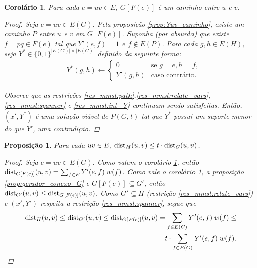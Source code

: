 \documentclass[11pt,reqno]{amsart}
\newcommand{\dist}{{\rm dist}}
\newtheorem{proposicao}{Proposição}
\newtheorem{corolario}{Corolário}
\begin{document}
\begin{corolario}
\label{corol:Yuv_define_caminho}
Para cada $e = uv \in E$, $G[F(e)]$ é um 
caminho entre $u$ e $v$.
\begin{proof}
Seja $e = uv \in E(G)$. Pela proposição \ref{prop:Yuv_caminho}, existe um 
caminho $P$ entre $u$ e $v$ em $G[F(e)]$. Suponha (por absurdo) que existe 
$f = pq \in F(e)$ tal que $Y'(e,f) = 1$ e $f \notin E(P)$. Para cada 
$g,h \in E(H)$, seja $Y^* \in \{0,1\}^{|E(G)| \times |E(G)|}$ definido da seguinte forma: 
\begin{align*}
&Y^*(g,h)\leftarrow
\begin{cases}
    0& \text{se $g = e, h = f,$}\\
    Y'(g,h)& \text{caso contrário.}
\end{cases}
\end{align*}

Observe que as restrições 
\ref{res_mmst:path},\ref{res_mmst:relate_vars}, \ref{res_mmst:spanner} e 
\ref{res_mmst:int_Y} continuam sendo satisfeitas. 
Então, %
$(x', Y^*)$
 é uma solução viável de $P(G,t)$ %
tal que $Y^*$ possui um suporte menor do que $Y'$, uma contradição.
\end{proof}
\end{corolario}

\begin{proposicao}
\label{prop:x_spanner}
Para cada $uv \in E,\;\dist_{H}(u,v) \le t \cdot \dist_{G}(u,v)$.
\begin{proof}
Seja $e=uv \in E(G)$.
Como valem o corolário 
\ref{corol:Yuv_define_caminho}, então \\
\mbox{$\dist_{G[F(e)]}(u,v) = \sum_{f \in E}Y'(e,f)\;w(f)$}. 
Como vale o corolário \ref{corol:Yuv_define_caminho}, a proposição 
\ref{prop:gerador_conexo_G} e 
$G[F(e)] \subseteq G'$, 
então \mbox{$\dist_{G'}(u,v) \le \dist_{G[F(e)]}(u,v)$}. Como $G' \subseteq H$ 
(restrição \ref{res_mmst:relate_vars}) e $(x',Y')$ respeita a restrição 
\ref{res_mmst:spanner}, segue que 
\begin{equation*}
\begin{split}
\dist_{H}(u,v) \le \dist_{G'}(u,v) \le \dist_{G[F(e)]}(u,v) = \sum_{f \in E(G)} Y'(e,f) \; w(f) \le \\
t \cdot \sum_{f \in E(G)}Y'(e,f)\;w(f).
\end{split}
\end{equation*}
\end{proof}
\end{proposicao}
\end{document}
